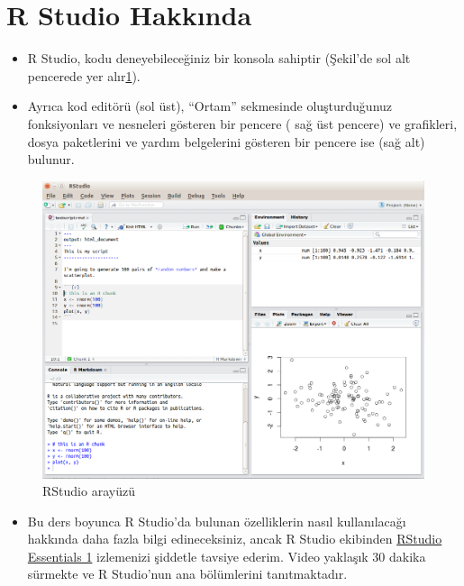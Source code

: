 \documentclass[
  oneside]{book}
\providecommand{\tightlist}{%
  \setlength{\itemsep}{0pt}\setlength{\parskip}{0pt}}
\begin{document}
\hypertarget{r-studio-hakkux131nda}{%
\section{R Studio Hakkında}\label{r-studio-hakkux131nda}}

\begin{itemize}
\item
  R Studio, kodu deneyebileceğiniz bir konsola sahiptir (Şekil'de sol alt pencerede yer alır\ref{fig:img-rstudio}).
\item
  Ayrıca kod editörü (sol üst), ``Ortam'' sekmesinde oluşturduğunuz fonksiyonları ve nesneleri gösteren bir pencere ( sağ üst pencere) ve grafikleri, dosya paketlerini ve yardım belgelerini gösteren bir pencere ise (sağ alt) bulunur.
\end{itemize}

\begin{figure}

{\centering \includegraphics[width=1\linewidth]{images/Rstudio} 

}

\caption{RStudio arayüzü}\label{fig:img-rstudio}
\end{figure}

\begin{itemize}
\tightlist
\item
  Bu ders boyunca R Studio'da bulunan özelliklerin nasıl kullanılacağı hakkında daha fazla bilgi edineceksiniz, ancak R Studio ekibinden \href{https://rstudio.com/resources/webinars/programming-part-1-writing-code-in-rstudio/}{RStudio Essentials 1} izlemenizi şiddetle tavsiye ederim. Video yaklaşık 30 dakika sürmekte ve R Studio'nun ana bölümlerini tanıtmaktadır.
\end{itemize}
\end{document}

